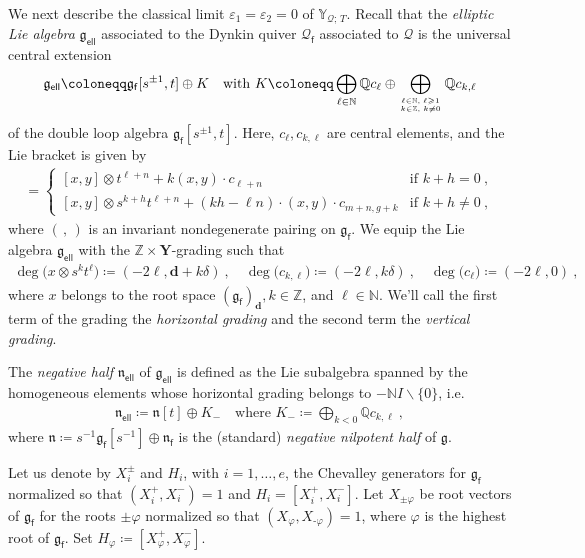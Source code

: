 \documentclass[reqno,a4paper]{amsart}
\newcommand{\N}{\mathbb{N}}
\newcommand{\Q}{\mathbb{Q}}
\newcommand{\Y}{\mathbb{Y}}
\newcommand{\Z}{\mathbb{Z}}
\newcommand{\sff}{\mathsf{f}}
\newcommand{\frakg}{\mathfrak{g}}
\newcommand{\frakn}{\mathfrak{n}}
\newcommand{\bfY}{\mathbf{Y}}
\newcommand{\bfd}{\mathbf{d}}
\newcommand{\qv}{\mathcal{Q}}
\newcommand{\qvfin}{\mathcal{Q}_\sff}
\newcommand{\rootlattice}{\bfY}
\newcommand{\frakgfin}{\frakg_\sff}
\newcommand{\fraknfin}{\frakn_\sff}
\newcommand{\frakgell}{\mathfrak{g}_{\mathsf{ell}}}
\newcommand{\fraknell}{\mathfrak{n}_{\mathsf{ell}}}
\theoremstyle{basic-theorem}
\numberwithin{equation}{section}
\begin{document}
We next describe the classical limit $\varepsilon_1=\varepsilon_2=0$ of $\Y_{\qv;\,T}$. Recall that the \textit{elliptic Lie algebra} $\frakgell$ associated to the Dynkin quiver $\qvfin$ associated to $\qv$ is the universal central extension 
\begin{align}\label{eq:elliptic}
	\frakgell \coloneqq \frakgfin[s^{\pm 1}, t]\oplus K\quad \text{with } K\coloneqq \bigoplus_{\ell\in \N}\Q c_\ell \oplus \bigoplus_{\genfrac{}{}{0pt}{}{\ell\in \N, \; \ell\geqslant 1}{k\in \Z, \; k\neq 0}} \Q c_{k, \ell}
\end{align} 
of the double loop algebra $\frakgfin[s^{\pm 1},t]$. Here, $c_{\ell}, c_{k, \ell}$ are central elements, and the Lie bracket is given by
\begin{align}
	[x\otimes s^k t^\ell, y\otimes s^h t^n]=
	\begin{cases}
		[x, y]\otimes t^{\ell+n}+ k(x, y)\cdot c_{\ell+n}  & \text{if } k+h=0\ ,\\[4pt]
		[x, y]\otimes s^{k+h} t^{\ell+n}+ (kh-\ell n) \cdot (x, y)\cdot c_{m+n, g+k} &\text{if } k+h\neq 0\ ,
	\end{cases}
\end{align}
where $(\,,\,)$ is an invariant nondegenerate pairing on $\frakgfin$. We equip the Lie algebra $\frakgell$ with the $\Z\times\rootlattice$-grading such that 
\begin{align}
	\deg\big(x\otimes s^k t^\ell\big)\coloneqq (-2\ell, \bfd+k\delta) \ , \quad \deg\big(c_{k, \ell}\big)\coloneqq (-2\ell, k\delta) \ , \quad \deg\big(c_{\ell}\big)\coloneqq (-2\ell, 0)\ ,
\end{align}
where $x$ belongs to the root space $(\frakgfin)_{\bfd}, k\in \Z$, and $\ell\in \N$. We'll call the first term of the grading the \textit{horizontal grading} and the second term the \textit{vertical grading}. 

The \textit{negative half} $\fraknell$ of $\frakgell$ is defined as the Lie subalgebra spanned by the homogeneous elements whose horizontal grading belongs to $-\N I\smallsetminus\{0\}$, i.e.
\begin{align}\label{eq:negative-half}
	\fraknell\coloneqq \frakn[t] \oplus K_- \quad\text{where } K_-\coloneqq \bigoplus _{k<0} \Q c_{k, \ell}\ ,
\end{align}
where $\frakn\coloneqq s^{-1}\frakgfin[s^{-1}] \oplus \fraknfin$ is the (standard) \textit{negative nilpotent half} of $\frakg$.

Let us denote by $X_i^\pm$ and $H_i$, with $i=1, \ldots, e$, the Chevalley generators for $\frakgfin$ normalized so that $(X_i^+,X_i^-) = 1$ and $H_i= [X_i^+,X_i^-]$. Let $X_{\pm \varphi}$ be root vectors of $\frakgfin$ for the roots $\pm\varphi$ normalized so that $(X_\varphi,X_{\textrm{-}\varphi}) = 1$, where $\varphi$ is the highest root of $\frakgfin$. Set $H_\varphi\coloneqq [X_\varphi^+,X_\varphi^-]$.
	
\end{document}
